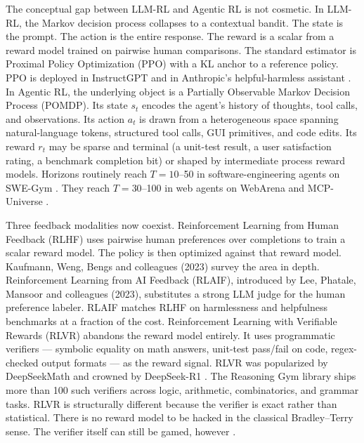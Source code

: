 \documentclass{article}
\begin{document}
The conceptual gap between LLM-RL and Agentic RL is not cosmetic. In LLM-RL, the Markov decision process collapses to a contextual bandit. The state is the prompt. The action is the entire response. The reward is a scalar from a reward model trained on pairwise human comparisons. The standard estimator is Proximal Policy Optimization (PPO) with a KL anchor to a reference policy. PPO is deployed in InstructGPT \citep{ouyang20222022} and in Anthropic's helpful-harmless assistant \citep{bai20222022}. In Agentic RL, the underlying object is a Partially Observable Markov Decision Process (POMDP). Its state \(s_t\) encodes the agent's history of thoughts, tool calls, and observations. Its action \(a_t\) is drawn from a heterogeneous space spanning natural-language tokens, structured tool calls, GUI primitives, and code edits. Its reward \(r_t\) may be sparse and terminal (a unit-test result, a user satisfaction rating, a benchmark completion bit) or shaped by intermediate process reward models. Horizons routinely reach \(T = 10\)--50 in software-engineering agents on SWE-Gym \citep{pan20242024}. They reach \(T = 30\)--100 in web agents on WebArena \citep{zhou20232023} and MCP-Universe \citep{luo20252025}.

Three feedback modalities now coexist. Reinforcement Learning from Human Feedback (RLHF) uses pairwise human preferences over completions to train a scalar reward model. The policy is then optimized against that reward model. Kaufmann, Weng, Bengs and colleagues (2023) survey the area in depth. Reinforcement Learning from AI Feedback (RLAIF), introduced by Lee, Phatale, Mansoor and colleagues (2023), substitutes a strong LLM judge for the human preference labeler. RLAIF matches RLHF on harmlessness and helpfulness benchmarks at a fraction of the cost. Reinforcement Learning with Verifiable Rewards (RLVR) abandons the reward model entirely. It uses programmatic verifiers --- symbolic equality on math answers, unit-test pass/fail on code, regex-checked output formats --- as the reward signal. RLVR was popularized by DeepSeekMath \citep{shao20242024} and crowned by DeepSeek-R1 \citep{guo20252025}. The Reasoning Gym library \citep{stojanovski20252025} ships more than 100 such verifiers across logic, arithmetic, combinatorics, and grammar tasks. RLVR is structurally different because the verifier is exact rather than statistical. There is no reward model to be hacked in the classical Bradley--Terry sense. The verifier itself can still be gamed, however \citep{helff20262026}.
\end{document}
